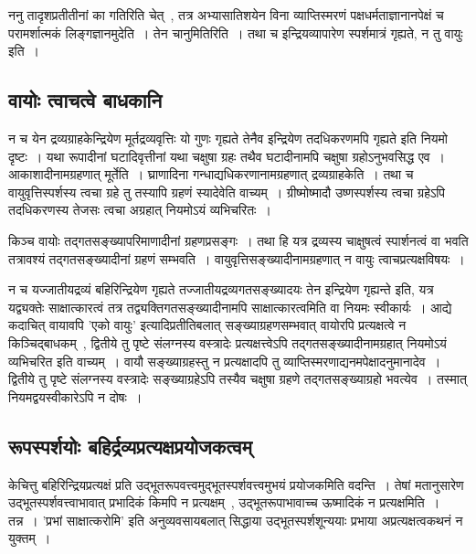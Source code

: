 		ननु तादृशप्रतीतीनां का गतिरिति चेत्~, तत्र अभ्यासातिशयेन विना व्याप्तिस्मरणं पक्षधर्मताज्ञानानपेक्षं च परामर्शात्मकं लिङ्गज्ञानमुदेति~। तेन चानुमितिरिति~। तथा च इन्द्रियव्यापारेण स्पर्शमात्रं गृह्यते, न तु वायुः‌ इति~।

		\subsection{वायोः त्वाचत्वे बाधकानि}

		न च येन द्रव्यग्राहकेन्द्रियेण मूर्तद्रव्यवृत्तिः‌ यो गुणः गृह्यते तेनैव इन्द्रियेण तदधिकरणमपि गृह्यते इति नियमो दृष्टः~। यथा रूपादीनां घटादिवृत्तीनां यथा चक्षुषा ग्रहः तथैव घटादीनामपि चक्षुषा ग्रहोऽनुभवसिद्ध एव~। आकाशादीनामग्रहणात् मूर्तेति~। घ्राणादिना गन्धाद्यधिकरणानामग्रहणात् द्रव्यग्राहकेति~। तथा च  वायुवृत्तिस्पर्शस्य त्वचा ग्रहे तु तस्यापि ग्रहणं स्यादेवेति वाच्यम्~। ग्रीष्मोष्मादौ उष्णस्पर्शस्य त्वचा ग्रहेऽपि तदधिकरणस्य तेजसः त्वचा अग्रहात् नियमोऽयं व्यभिचरितः~। 

		किञ्च वायोः तद्गतसङ्ख्यापरिमाणादीनां ग्रहणप्रसङ्गः~। तथा हि यत्र द्रव्यस्य चाक्षुषत्वं स्पार्शनत्वं वा भवति तत्रावश्यं तद्गतसङ्ख्यादीनां ग्रहणं सम्भवति~। वायुवृत्तिसङ्ख्यादीनामग्रहणात् न वायुः त्वाचप्रत्यक्षविषयः~।

		न च यज्जातीयद्रव्यं बहिरिन्द्रियेण गृह्यते तज्जातीयद्रव्यगतसङ्ख्यादयः तेन इन्द्रियेण गृह्यन्ते इति, यत्र यद्व्यक्तेः साक्षात्कारत्वं तत्र तद्व्यक्तिगतसङ्ख्यादीनामपि साक्षात्कारत्वमिति वा नियमः स्वीकार्यः~। आद्ये कदाचित् वायावपि 'एको वायुः' इत्यादिप्रतीतिबलात् सङ्ख्याग्रहणसम्भवात् वायोरपि प्रत्यक्षत्वे न किञ्चिद्बाधकम्~, द्वितीये तु पृष्टे संलग्नस्य वस्त्रादेः प्रत्यक्षत्त्वेऽपि तद्गतसङ्ख्यादीनामग्रहात् नियमोऽयं व्यभिचरित इति वाच्यम्~। वायौ सङ्ख्याग्रहस्तु न प्रत्यक्षादपि तु  व्याप्तिस्मरणाद्यनमपेक्षादनुमानादेव~। द्वितीये तु पृष्टे संलग्नस्य वस्त्रादेः‌ सङ्ख्याग्रहेऽपि तस्यैव चक्षुषा ग्रहणे तद्गतसङ्ख्याग्रहो भवत्येव~।‌ तस्मात् नियमद्वयस्वीकारेऽपि न दोषः~। 

		\subsection{रूपस्पर्शयोः बहिर्द्रव्यप्रत्यक्षप्रयोजकत्वम्}

		केचित्तु बहिरिन्द्रियप्रत्यक्षं प्रति उद्भूतरूपवत्त्वमुद्भूतस्पर्शवत्त्वमुभयं प्रयोजकमिति वदन्ति~। तेषां मतानुसारेण उद्भूतस्पर्शवत्त्वाभावात् प्रभादिकं किमपि न प्रत्यक्षम्~, उद्भूतरूपाभावाच्च ऊष्मादिकं न प्रत्यक्षमिति~। तन्न~। 'प्रभां साक्षात्करोमि' इति अनुव्यवसायबलात् सिद्धाया उद्भूतस्पर्शशून्ययाः प्रभाया अप्रत्यक्षत्वकथनं न युक्तम्~।

